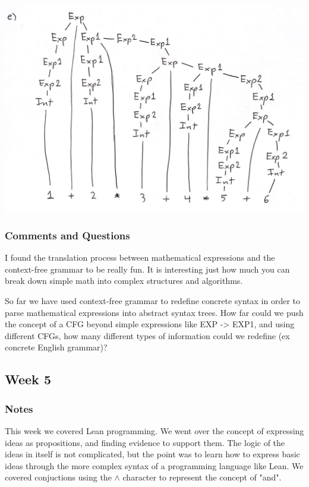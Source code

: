 \documentclass{article}
\theoremstyle{theorem}
\theoremstyle{definition}
\theoremstyle{remark}
\begin{document}
\begin{center}
  \includegraphics*[scale=0.15]{treeE.jpg}
  \end{center}

\subsubsection{Comments and Questions}
I found the translation process between mathematical expressions and the context-free grammar to be really fun. It is interesting just how much you can
break down simple math into complex structures and algorithms.

\hspace{0.65cm}So far we have used context-free grammar to redefine concrete 
syntax in order to parse mathematical expressions into abstract 
syntax trees. How far could we push the concept of a CFG beyond 
simple expressions like EXP -> EXP1, and using different CFGs, 
how many different types of information could we redefine 
(ex concrete English grammar)?

\subsection{Week 5}
\subsubsection{Notes}

This week we covered Lean programming. We went over the concept of expressing ideas as propositions, and finding evidence to support them. The logic of the ideas in itself is not complicated, 
but the point was to learn how to express basic ideas through the more complex syntax of a programming language like Lean. We covered conjuctions using the $\wedge$ character to represent the concept of "and".
\end{document}
